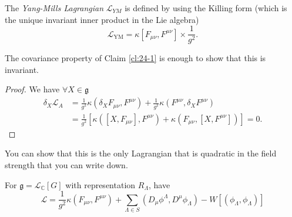\begin{definition}[]
  The \emph{Yang-Mills Lagrangian} $\mathcal{L}_{YM}$  is defined by using the Killing form (which is the unique invariant inner product in the Lie algebra)
  \begin{equation}
    \mathcal{L}_{\text{YM}} = \kappa[F_{\mu\nu}, F^{\mu\nu}] \times \frac{1}{g^2}.
  \end{equation}
\end{definition}
\begin{claim}
  The covariance property of Claim \ref{cl:24-1} is enough to show that this is invariant.
\end{claim}
\begin{proof}
  We have $\forall X \in \mathfrak{g}$
  \begin{align}
    \delta_X \mathcal{L}_A &= \frac{1}{g^2} \kappa (\delta_X F_{\mu\nu}, F^{\mu\nu}) + \frac{1}{g^2} \kappa(F^{\mu\nu}, \delta_X F^{\mu\nu}) \\
			   &= \frac{1}{g^2} [\kappa([X, F_{\mu\nu}], F^{\mu\nu}) + \kappa(F_{\mu\nu}, [X, F^{\mu\nu}])] = 0.
  \end{align}
\end{proof}

\begin{remark}
  You can show that this is the only Lagrangian that is quadratic in the field strength that you can write down.
\end{remark}

For $\mathfrak{g} = \mathscr{L}_{\mathbb{C}}[G]$ with representation $R_{\Lambda}$, have
\begin{equation}
  \mathcal{L} = \frac{1}{g^2} \kappa (F_{\mu\nu}, F^{\mu\nu}) + \sum_{\Lambda \in S} (D_{\mu} \phi^{\Lambda}, D^{\mu} \phi_{\Lambda}) - W[(\phi_{\Lambda}, \phi_{\Lambda})]
\end{equation}
